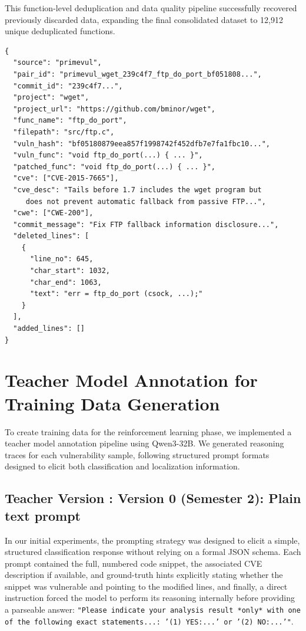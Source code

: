 \documentclass[12pt,a4paper]{article}
\makeatletter
\newcounter{TeacherVer}
\newcommand{\teacherversion}[2]{%
  \stepcounter{TeacherVer}%
  \subsection{Teacher Version \theTeacherVer: #1}%
  \protected@edef\@currentlabel{\theTeacherVer}\label{#2}%
}
\makeatother
\begin{document}
This function-level deduplication and data quality pipeline successfully recovered previously discarded data, expanding the final consolidated dataset to 12,912 unique deduplicated functions.

\begin{lstlisting}[caption={Example of the function-level deduplicated dataset entry structure}]
{
  "source": "primevul",
  "pair_id": "primevul_wget_239c4f7_ftp_do_port_bf051808...",
  "commit_id": "239c4f7...",
  "project": "wget",
  "project_url": "https://github.com/bminor/wget",
  "func_name": "ftp_do_port",
  "filepath": "src/ftp.c",
  "vuln_hash": "bf05180879eea857f1998742f452dfb7e7fa1fbc10...",
  "vuln_func": "void ftp_do_port(...) { ... }",
  "patched_func": "void ftp_do_port(...) { ... }",
  "cve": ["CVE-2015-7665"],
  "cve_desc": "Tails before 1.7 includes the wget program but 
     does not prevent automatic fallback from passive FTP...",
  "cwe": ["CWE-200"],
  "commit_message": "Fix FTP fallback information disclosure...",
  "deleted_lines": [
    {
      "line_no": 645, 
      "char_start": 1032, 
      "char_end": 1063, 
      "text": "err = ftp_do_port (csock, ...);"
    }
  ],
  "added_lines": []
}
\end{lstlisting}

\section{Teacher Model Annotation for Training Data Generation} \label{sec:teacher_model_annotation}

To create training data for the reinforcement learning phase, we implemented a teacher model annotation pipeline using Qwen3-32B. We generated reasoning traces for each vulnerability sample, following structured prompt formats designed to elicit both classification and localization information.

\teacherversion{Version 0 (Semester 2): Plain text prompt}{ver:teacher_sem2}
In our initial experiments, the prompting strategy was designed to elicit a simple, structured classification response without relying on a formal JSON schema. Each prompt contained the full, numbered code snippet, the associated CVE description if available, and ground-truth hints explicitly stating whether the snippet was vulnerable and pointing to the modified lines, and finally, a direct instruction forced the model to perform its reasoning internally before providing a parseable answer: \texttt{"Please indicate your analysis result *only* with one of the following exact statements...: '(1) YES:...' or '(2) NO:...'"}.
\end{document}
